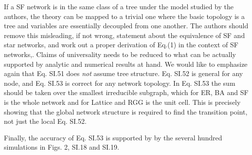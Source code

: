\documentclass[11pt]{article}
\begin{document}
\begin{response}{
If a SF network is in the same class of a tree under the model studied by the authors, the theory can be mapped to a 
trivial one where the basic topology is a tree and variables are essentially 
decoupled from one another. 
The authors should remove this misleading, if not wrong, statement about the equivalence 
of SF and star networks, and work out a proper derivation of Eq.(1) in the context of SF networks,. Claims of universality needs to be reduced to what can be actually supported by analytic and numerical results at hand. 
}
We would like to emphasize again that Eq. SI.51 does {\em not} assume tree structure.
Eq. SI.52 is general for any node, and Eq. SI.53 is correct for any network topology.
In Eq. SI.53 the sum should be taken over the smallest irreducible subgraph, which for ER, BA and SF is the whole network and for Lattice and RGG is the unit cell. 
This is precisely showing that the global network structure is required to find the transition point, not just the local Eq. SI.52. 

Finally, the accuracy of Eq. SI.53 is supported by by the several hundred simulations in Figs. 2, SI.18 and SI.19. 

\end{response}
\end{document}
